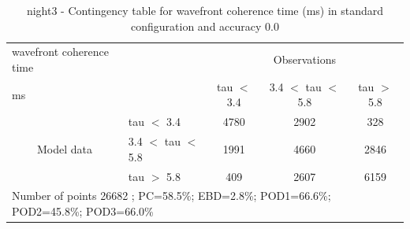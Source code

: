 \begin{table}[p!]
\begin{center}
\begin{tabular}{llccc}
\hline
{wavefront coherence time}                                       &                                                    & \multicolumn{3}{c}{Observations}                 \\
{ms}                                       &                             & tau $<$ 3.4   & 3.4 $<$ tau $<$ 5.8 & tau $>$ 5.8 \\
\hline
\multicolumn{1}{c}{\multirow{3}{*}{Model data}}  & tau $<$ 3.4             & 4780                & 2902                       & 328              \\
                                                 & 3.4  $<$ tau $<$ 5.8 & 1991                & 4660                       & 2846              \\
                                                 & tau $>$ 5.8             & 409                & 2607                       & 6159              \\
\hline
\multicolumn{5}{l}{ Number of points        26682 ; PC=58.5\%; EBD=2.8\%; POD1=66.6\%; POD2=45.8\%; POD3=66.0\%}
\end{tabular}
\end{center}
\caption{night3 - Contingency table for  wavefront coherence time (ms) in standard configuration and accuracy 0.0}
\label{tab:contingencytauBEF:night3}
\end{table}
